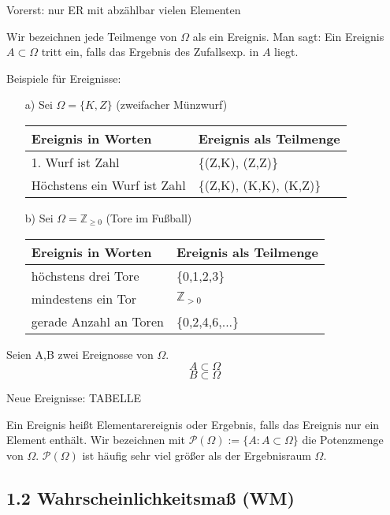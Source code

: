 \documentclass[10pt,a4paper,titlepage]{book}
\begin{document}
Vorerst: nur ER mit abzählbar vielen Elementen

Wir bezeichnen jede Teilmenge von $\Omega$ als ein Ereignis. Man sagt: Ein Ereignis $A \subset \Omega$ tritt ein, falls das Ergebnis des Zufallsexp. in $A$ liegt.

Beispiele für Ereignisse:
\begin{itemize}
\item [a)] Sei $\Omega = \{K,Z\}$ (zweifacher Münzwurf)\\

\begin{tabular}{l|l}
Ereignis in Worten          & Ereignis als Teilmenge  \\ \hline
1. Wurf ist Zahl            & \{(Z,K), (Z,Z)\}        \\
Höchstens ein Wurf ist Zahl & \{(Z,K), (K,K), (K,Z)\}
\end{tabular}

\item [b)] Sei $\Omega = \mathbb{Z}_{\geq 0}$ (Tore im Fußball)\\

\begin{tabular}{l|l}
Ereignis in Worten          & Ereignis als Teilmenge  \\ \hline
höchstens drei Tore           & \{0,1,2,3\}        \\
mindestens ein Tor & $\mathbb{Z}_{> 0}$ \\
gerade Anzahl an Toren & \{0,2,4,6,...\}
\end{tabular}
\end{itemize}

Seien A,B zwei Ereignosse von $\Omega$.
$$A \subset \Omega$$
$$B \subset \Omega$$

Neue Ereignisse:
TABELLE

Ein Ereignis heißt Elementarereignis oder Ergebnis, falls das Ereignis nur ein Element enthält. Wir bezeichnen mit $\mathcal{P}(\Omega) := \{A: A\subset \Omega\}$ die Potenzmenge von $\Omega$. $\mathcal{P}(\Omega)$ ist häufig sehr viel größer als der Ergebnisraum $\Omega$.

\subsection*{1.2 Wahrscheinlichkeitsmaß (WM)}
\newcommand{\abbildung}{$P: \mathcal{P}(\Omega) \rightarrow [0;1]$}
\end{document}

